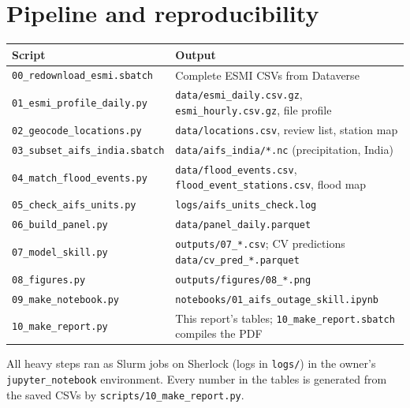 \documentclass[11pt,a4paper]{article}
\newcommand{\code}[1]{\texttt{\small #1}}
\begin{document}
\section{Pipeline and reproducibility}
\begin{table}[H]\centering\small
\begin{tabular}{p{5.4cm}p{10.2cm}}\toprule
Script & Output \\ \midrule
\code{00\_redownload\_esmi.sbatch} & Complete ESMI CSVs from Dataverse \\
\code{01\_esmi\_profile\_daily.py} & \code{data/esmi\_daily.csv.gz}, \code{esmi\_hourly.csv.gz}, file profile \\
\code{02\_geocode\_locations.py} & \code{data/locations.csv}, review list, station map \\
\code{03\_subset\_aifs\_india.sbatch} & \code{data/aifs\_india/*.nc} (precipitation, India) \\
\code{04\_match\_flood\_events.py} & \code{data/flood\_events.csv}, \code{flood\_event\_stations.csv}, flood map \\
\code{05\_check\_aifs\_units.py} & \code{logs/aifs\_units\_check.log} \\
\code{06\_build\_panel.py} & \code{data/panel\_daily.parquet} \\
\code{07\_model\_skill.py} & \code{outputs/07\_*.csv}; CV predictions \code{data/cv\_pred\_*.parquet} \\
\code{08\_figures.py} & \code{outputs/figures/08\_*.png} \\
\code{09\_make\_notebook.py} & \code{notebooks/01\_aifs\_outage\_skill.ipynb} \\
\code{10\_make\_report.py} & This report's tables; \code{10\_make\_report.sbatch} compiles the PDF \\
\bottomrule\end{tabular}
\end{table}
\noindent All heavy steps ran as Slurm jobs on Sherlock (logs in \code{logs/}) in the owner's
\code{jupyter\_notebook} environment. Every number in the tables is generated from the saved CSVs by
\code{scripts/10\_make\_report.py}.
\end{document}
